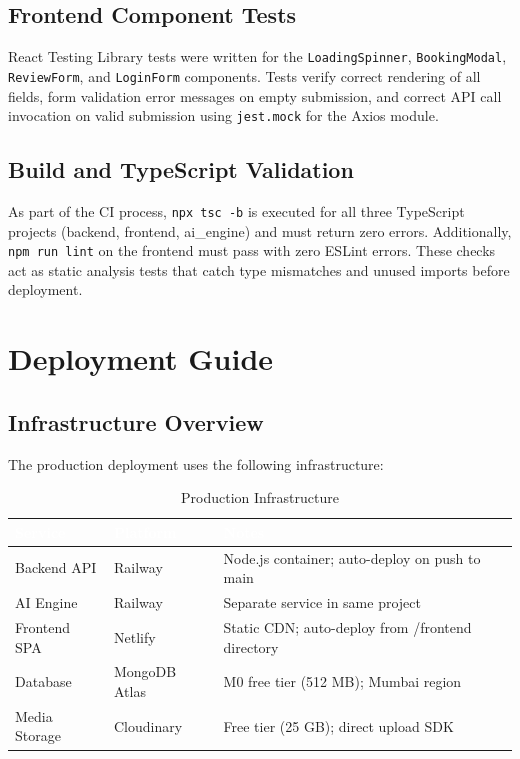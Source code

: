 \documentclass[12pt,a4paper]{report}
\newcommand{\thead}[1]{\cellcolor{tableheader}\textcolor{white}{\textbf{#1}}}
\begin{document}
\section{Frontend Component Tests}

React Testing Library tests were written for the \texttt{LoadingSpinner}, \texttt{BookingModal}, \texttt{ReviewForm}, and \texttt{LoginForm} components. Tests verify correct rendering of all fields, form validation error messages on empty submission, and correct API call invocation on valid submission using \texttt{jest.mock} for the Axios module.

\section{Build and TypeScript Validation}

As part of the CI process, \texttt{npx tsc -b} is executed for all three TypeScript projects (backend, frontend, ai\_engine) and must return zero errors. Additionally, \texttt{npm run lint} on the frontend must pass with zero ESLint errors. These checks act as static analysis tests that catch type mismatches and unused imports before deployment.

\chapter{Deployment Guide}

\section{Infrastructure Overview}

The production deployment uses the following infrastructure:

\begin{table}[h!]
\centering
\caption{Production Infrastructure}
\renewcommand{\arraystretch}{1.3}
\begin{tabular}{|p{3cm}|p{3.5cm}|p{6cm}|}
\hline
\thead{Service} & \thead{Platform} & \thead{Notes} \\
\hline
Backend API & Railway & Node.js container; auto-deploy on push to main \\
AI Engine & Railway & Separate service in same project \\
Frontend SPA & Netlify & Static CDN; auto-deploy from /frontend directory \\
Database & MongoDB Atlas & M0 free tier (512 MB); Mumbai region \\
Media Storage & Cloudinary & Free tier (25 GB); direct upload SDK \\
\hline
\end{tabular}
\end{table}
\end{document}
